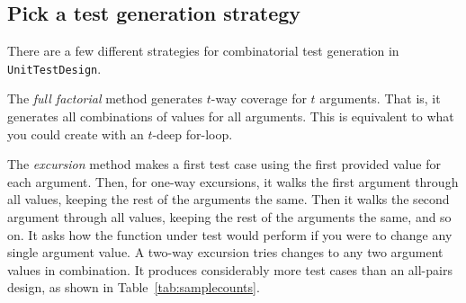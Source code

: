 \documentclass{juliacon}
\newcommand{\utd}{\texttt{UnitTestDesign}\xspace}
\begin{document}
\subsection{Pick a test generation strategy}

There are a few different strategies for combinatorial test generation in \utd.

\vskip 6pt
The \emph{full factorial} method generates $t$-way coverage for $t$ arguments. That is, it generates all combinations of values for all arguments. This is equivalent to what you could create with an $t$-deep for-loop.

\vskip 6pt
The \emph{excursion} method makes a first test case using the first provided value for each argument. Then, for one-way excursions, it walks the first argument through all values, keeping the rest of the arguments the same. Then it walks the second argument through all values, keeping the rest of the arguments the same, and so on. It asks how the function under test would perform if you were to change any single argument value. A two-way excursion tries changes to any two argument values in combination. It produces considerably more test cases than an all-pairs design, as shown in Table~\ref{tab:samplecounts}.

\begin{table}
\end{table}
\end{document}
